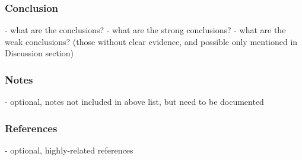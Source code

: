 \documentclass[lang=en,mode=normal,device=normal,color=blue,12pt]{elegantnote}
\DeclareMathOperator*{\1}{\mathbbm{1}}
\begin{document}
\subsubsection{Conclusion}

- what are the conclusions?
- what are the strong conclusions?
- what are the weak conclusions? (those without clear evidence, and possible only mentioned in Discussion section)

\subsubsection{Notes}

- optional, notes not included in above list, but need to be documented

\subsubsection{References}
- optional, highly-related references





\end{document}
